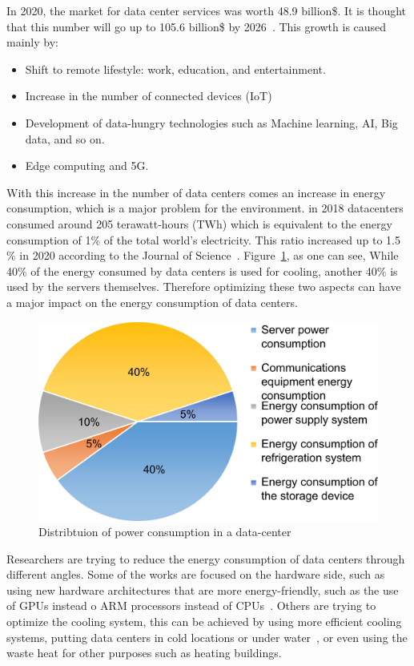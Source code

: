 In 2020, the market for data center services was worth 48.9 billion\$. It is thought that this number will go up to 105.6 billion\$ by 2026~\cite{inshakova2022data}. This growth is caused mainly by:
\begin{itemize}
    \item Shift to remote lifestyle: work, education, and entertainment.
    \item Increase in the number of connected devices (IoT)
    \item Development of data-hungry technologies such as Machine learning, AI, Big data, and so on.
    \item Edge computing and 5G.
\end{itemize}

With this increase in the number of data centers comes an increase in energy consumption, which is a major problem for the environment.
in 2018 datacenters consumed around 205 terawatt-hours (TWh)\cite{schneider2021world} which is equivalent to the energy consumption of 1\% of the total world's electricity. This ratio increased up to 1.5 \% in 2020 according to the Journal of Science~\cite{mytton2021data}. Figure~\ref{fig:data_centers_power_distribution}, as one can see, While 40\% of the energy consumed by data centers is used for cooling, another 40\% is used by the servers themselves. Therefore optimizing these two aspects can have a major impact on the energy consumption of data centers.
\begin{figure}[!h]
    \centering
    \includegraphics[width=0.6\linewidth]{chapters/data_centers_power_distribution}
    \caption{Distribtuion of power consumption in a data-center\cite{rong2016optimizing}}
    \label{fig:data_centers_power_distribution}
\end{figure}

Researchers are trying to reduce the energy consumption of data centers through different angles. Some of the works are focused on the hardware side, such as using new hardware architectures that are more energy-friendly, such as the use of GPUs instead o ARM processors instead of CPUs~\cite{aroca2012towards}. Others are trying to optimize the cooling system, this can be achieved by using more efficient cooling systems, putting data centers in cold locations or under water~\cite{simon2018project}, or even using the waste heat for other purposes such as heating buildings\cite{bouzel2021distributed,cao2021carbon}.

